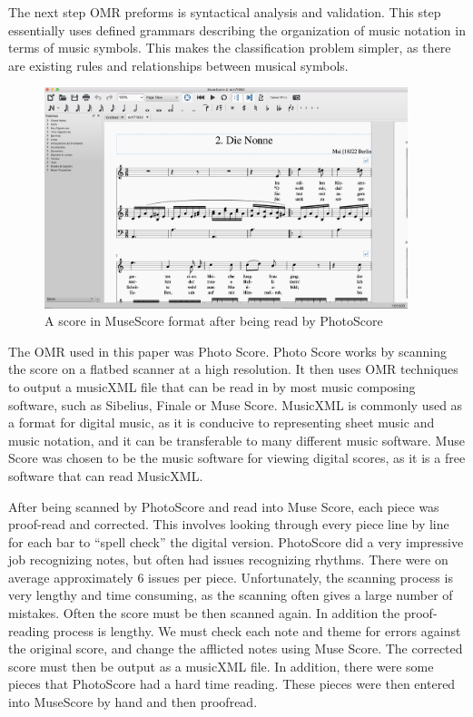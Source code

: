 \documentclass[12pt,twoside]{reedthesis}
\theoremstyle{definition}
\theoremstyle{definition}
\theoremstyle{definition}
\theoremstyle{remark}
\begin{document}
The next step OMR preforms is syntactical analysis and validation. This
step essentially uses defined grammars describing the organization of
music notation in terms of music symbols. This makes the classification
problem simpler, as there are existing rules and relationships between
musical symbols.
\begin{Shaded}
\begin{Highlighting}[]
\OperatorTok{::}\NormalTok{(}\NormalTok{)}
\end{Highlighting}
\end{Shaded}
\begin{figure}
\includegraphics[width=400px]{images/museScore} \caption{A score in MuseScore format after being read by PhotoScore}\label{fig:unnamed-chunk-2}
\end{figure}
The OMR used in this paper was Photo Score. Photo Score works by
scanning the score on a flatbed scanner at a high resolution. It then
uses OMR techniques to output a musicXML file that can be read in by
most music composing software, such as Sibelius, Finale or Muse Score.
MusicXML is commonly used as a format for digital music, as it is
conducive to representing sheet music and music notation, and it can be
transferable to many different music software. Muse Score was chosen to
be the music software for viewing digital scores, as it is a free
software that can read MusicXML.

After being scanned by PhotoScore and read into Muse Score, each piece
was proof-read and corrected. This involves looking through every piece
line by line for each bar to ``spell check'' the digital version.
PhotoScore did a very impressive job recognizing notes, but often had
issues recognizing rhythms. There were on average approximately 6 issues
per piece. Unfortunately, the scanning process is very lengthy and time
consuming, as the scanning often gives a large number of mistakes. Often
the score must be then scanned again. In addition the proof-reading
process is lengthy. We must check each note and theme for errors against
the original score, and change the afflicted notes using Muse Score. The
corrected score must then be output as a musicXML file. In addition,
there were some pieces that PhotoScore had a hard time reading. These
pieces were then entered into MuseScore by hand and then proofread.
\end{document}
